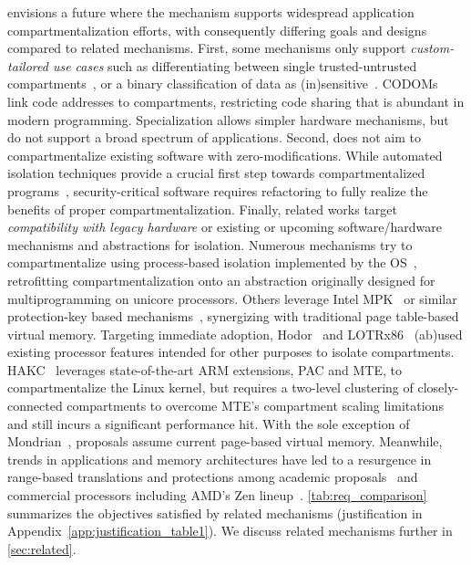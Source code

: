 \seccells envisions a future where the mechanism supports 
widespread application
compartmentalization efforts, with consequently differing goals
and designs compared to related mechanisms.
% 
First, some mechanisms only support \emph{custom-tailored use cases}
such as differentiating between single trusted-untrusted 
compartments~\cite{HedayatiGJCSSM19Hodor,KoningCBGA17,Kilpatrick03}, %
or a binary classification of data as (in)sensitive~\cite{FrassettoJLS18}.
CODOMs~\cite{VilanovaBNEV14} link code addresses to compartments,
restricting code sharing that is abundant in modern programming.
Specialization allows simpler hardware mechanisms, but do not support
a broad spectrum of applications.
Second, \seccells does not aim to compartmentalize existing software with
zero-modifications.
While automated isolation techniques provide a crucial first step towards
compartmentalized programs~\cite{RoesslerAPMPKPB21,KirthDCLDGNVF22,
VasilakisKRDDS17}, security-critical software requires refactoring to fully
realize the benefits of proper compartmentalization.
Finally, related works target \emph{compatibility with legacy hardware}
or existing or upcoming software/hardware mechanisms and abstractions for 
isolation.
Numerous mechanisms try to compartmentalize using process-based isolation
implemented by the OS~\cite{LittonVE0BD16,DuHXZC19XPC,KleinEHACDEEKNSTW09}, 
retrofitting compartmentalization onto an abstraction originally designed for
multiprogramming on unicore processors.
Others leverage Intel MPK~\cite{HedayatiGJCSSM19Hodor,ERIMOberwagner19,KoningCBGA17}
or similar protection-key based mechanisms~\cite{SchrammelWSS0MG20Donky},
synergizing with traditional page table-based virtual memory.
Targeting immediate adoption, Hodor~\cite{HedayatiGJCSSM19Hodor} and 
LOTRx86~\cite{LeeSK18} (ab)used existing processor features intended for 
other purposes to isolate compartments.
HAKC~\cite{mckee2022preventing} leverages state-of-the-art ARM extensions, 
PAC and MTE, to compartmentalize the Linux kernel, but requires a two-level 
clustering of closely-connected compartments to overcome MTE's 
compartment scaling limitations and still incurs a significant performance hit.
With the sole exception of Mondrian~\cite{WitchelCA02MMP}, proposals
assume current page-based virtual memory.
Meanwhile, trends in applications and memory architectures have led to a 
resurgence in range-based translations and protections among academic 
proposals~\cite{BasuGCHS13,YanLNB19,PhamVJB12,0003BOBFP21midgard,KarakostasGACHM15}
and commercial processors including AMD's Zen lineup~\cite{preservingvma}.
\autoref{tab:req_comparison} summarizes the objectives satisfied by related 
mechanisms (justification in Appendix~\ref{app:justification_table1}).
We discuss related mechanisms further in \autoref{sec:related}.
 
